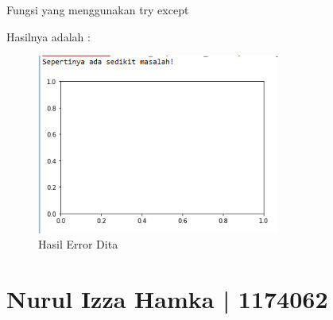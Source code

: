 \begin{enumerate}
Fungsi yang menggunakan try except

Hasilnya adalah : 
\begin{figure}[H]
	\includegraphics[width=8cm]{figures/6/1174054/Praktek/error.png}
	\centering
	\caption{Hasil Error Dita}
\end{figure}

\end{enumerate}


\section{Nurul Izza Hamka | 1174062}
